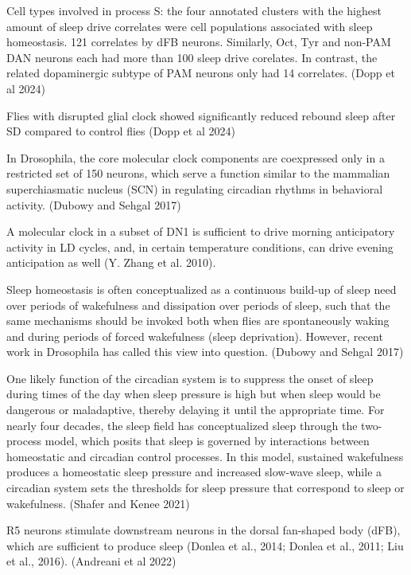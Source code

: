 \documentclass[12pt]{article}
\begin{document}
Cell types involved in process S: the four annotated clusters with the highest
amount of sleep drive correlates were cell populations associated with sleep homeostasis.
121 correlates by dFB neurons. Similarly, Oct, Tyr and non-PAM DAN
neurons each had more than 100 sleep drive corelates. In contrast, the related
dopaminergic subtype of PAM neurons only had 14 correlates.
(Dopp et al 2024)


Flies with disrupted glial clock showed significantly reduced rebound sleep after SD compared to control flies
(Dopp et al 2024)

In Drosophila, the core molecular clock components are coexpressed only in a restricted
set of 150 neurons, which serve a function similar to the mammalian superchiasmatic nucleus
(SCN) in regulating circadian rhythms in behavioral activity.
\cite{dubowyCircadianRhythmsSleep2017} (Dubowy and Sehgal 2017)

A molecular clock in a subset of DN1 is sufficient to drive morning anticipatory activity
in LD cycles, and, in certain temperature conditions, can drive evening anticipation as well 
(Y. Zhang et al. 2010).

Sleep homeostasis is often conceptualized as a continuous build-up of sleep need over
periods of wakefulness and dissipation over periods of sleep, such that the same mechanisms
should be invoked both when flies are spontaneously waking and during periods of forced 
wakefulness (sleep deprivation). However, recent work in Drosophila has called this view 
into question.
\cite{dubowyCircadianRhythmsSleep2017} (Dubowy and Sehgal 2017)


One likely function of the circadian system is to suppress the onset of
sleep during times of the day when sleep pressure is high but when sleep would be
dangerous or maladaptive, thereby delaying it until the appropriate time.
For nearly four decades, the sleep field has conceptualized sleep through the
two-process model, which posits that sleep is governed by interactions between
homeostatic and circadian control processes.
In this model, sustained wakefulness produces a homeostatic sleep pressure
and increased slow-wave sleep, while a circadian system sets the thresholds
for sleep pressure that correspond to sleep or wakefulness.
\cite{shaferRegulationDrosophilaSleep2021} (Shafer and Kenee 2021)


\color{red}
R5 neurons stimulate downstream neurons in the dorsal fan-shaped body (dFB), which are 
sufficient to produce sleep (Donlea et al., 2014; Donlea et al., 2011; Liu et al., 2016).
\cite{andreaniCircadianProgrammingEllipsoid2022} (Andreani et al 2022)
\end{document}
